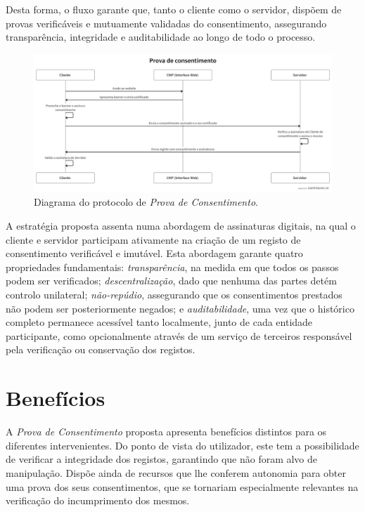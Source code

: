 Desta forma, o fluxo garante que, tanto o cliente como o servidor, dispõem de provas verificáveis e mutuamente validadas do consentimento, assegurando transparência, integridade e auditabilidade ao longo de todo o processo.

\begin{figure}[h]
\begin{center}
\includegraphics[width=1\textwidth]{images/swimlanes.png}
\end{center}
\caption{Diagrama do protocolo de \textit{Prova de Consentimento}.}
\label{fig:swimlane1}
\end{figure}

\newpage

A estratégia proposta assenta numa abordagem de assinaturas digitais, na qual o cliente e servidor participam ativamente na criação de um registo de consentimento verificável e imutável. Esta abordagem garante quatro propriedades fundamentais: \textit{transparência}, na medida em que todos os passos podem ser verificados; \textit{descentralização}, dado que nenhuma das partes detém controlo unilateral; \textit{não-repúdio}, assegurando que os consentimentos prestados não podem ser posteriormente negados; e \textit{auditabilidade}, uma vez que o histórico completo permanece acessível tanto localmente, junto de cada entidade participante, como opcionalmente através de um serviço de terceiros responsável pela verificação ou conservação dos registos.

\section{Benefícios}

A \textit{Prova de Consentimento} proposta apresenta benefícios distintos para os diferentes intervenientes.
Do ponto de vista do utilizador, este tem a possibilidade de verificar a integridade dos registos, garantindo que não foram alvo de manipulação. Dispõe ainda de recursos que lhe conferem autonomia para obter uma prova dos seus consentimentos, que se tornariam especialmente relevantes na verificação do incumprimento dos mesmos.

